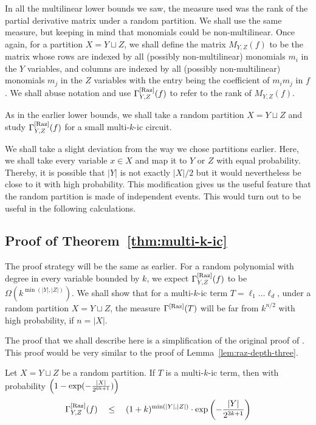 In all the multilinear lower bounds we saw, the measure used was the rank of the partial derivative matrix under a random partition. We shall use the same measure, but keeping in mind that monomials could be non-multilinear. Once again, for a partition $X = Y \sqcup Z$, we shall define the matrix $M_{Y,Z}(f)$ to be the matrix whose rows are indexed by all (possibly non-multilinear) monomials $m_i$ in the $Y$ variables, and columns are indexed by all (possibly non-multilinear) monomials $m_j$ in the $Z$ variables with the entry being the coefficient of $m_i m_j$ in $f$. We shall abuse notation and use $\Gamma^{\mathrm{[Raz]}}_{Y,Z}(f)$ to refer to the rank of $M_{Y,Z}(f)$. 

As in the earlier lower bounds, we shall take a random partition $X = Y \sqcup Z$ and study $\Gamma^{\mathrm{[Raz]}}_{Y,Z}(f)$ for a small multi-$k$-ic circuit. 

\begin{remark*}\rm 
We shall take a slight deviation from the way we chose partitions earlier. Here, we shall take every variable $x\in X$ and map it to $Y$ or $Z$ with equal probability. Thereby, it is possible that $|Y|$ is not exactly $|X|/2$ but it would nevertheless be close to it with high probability. This modification gives us the useful feature that the random partition is made of independent events. This would turn out to be useful in the following calculations. 
\end{remark*}

\subsection*{Proof of Theorem~\ref{thm:multi-k-ic}}

The proof strategy will be the same as earlier. For a random polynomial with degree in every variable bounded by $k$, we expect $\Gamma^{\mathrm{[Raz]}}_{Y,Z}(f)$ to be $\Omega(k^{\min(|Y|,|Z|)})$. We shall show that for a multi-$k$-ic term $T = \ell_1\dots \ell_d$, under a random partition $X = Y \sqcup Z$, the measure $\Gamma^{\mathrm{[Raz]}}(T)$ will be far from $k^{n/2}$ with high probability, if $n = |X|$. 

The proof that we shall describe here is a simplification of the original proof of \cite{ks15}. This proof would be very similar to the proof of Lemma~\ref{lem:raz-depth-three}. 

\begin{lemma}\label{lem:multi-k-ic-ub}
Let $X = Y \sqcup Z$ be a random partition. If $T$ is a multi-$k$-ic term, then with probability $\left(1 - \exp(-\frac{|X|}{2^{6k+1}})\right)$
\[
\Gamma^{\mathrm{[Raz]}}_{Y,Z}(f) \quad \leq \quad (1+k)^{\min(|Y|,|Z|)}\cdot \exp\left(-\frac{|Y|}{2^{3k+1}}\right)
\]
\end{lemma}


